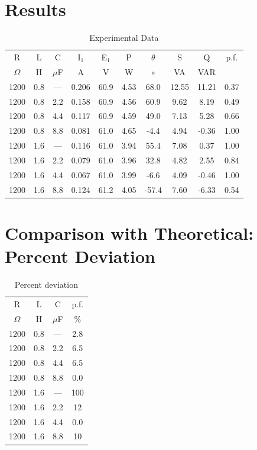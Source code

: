 \documentclass{article}
\begin{document}
\section{Results}
\begin{table}[h]
  \begin{center}
    \begin{tabular}{cccccccccc}
      \hline
      R & L & C & I$_1$ & E$_1$ & P & $\theta$ & S & Q & p.f. \\
      $\Omega$ & H & $\mu$F & A & V & W & $\circ$ & VA & VAR & \\
      \hline
      1200 & 0.8 & --- & 0.206 & 60.9 & 4.53 &  68.0 & 12.55 & 11.21 & 0.37 \\
      1200 & 0.8 & 2.2 & 0.158 & 60.9 & 4.56 &  60.9 &  9.62 &  8.19 & 0.49 \\
      1200 & 0.8 & 4.4 & 0.117 & 60.9 & 4.59 &  49.0 &  7.13 &  5.28 & 0.66 \\
      1200 & 0.8 & 8.8 & 0.081 & 61.0 & 4.65 &  -4.4 &  4.94 & -0.36 & 1.00 \\
      1200 & 1.6 & --- & 0.116 & 61.0 & 3.94 &  55.4 &  7.08 &  0.37 & 1.00 \\
      1200 & 1.6 & 2.2 & 0.079 & 61.0 & 3.96 &  32.8 &  4.82 &  2.55 & 0.84 \\
      1200 & 1.6 & 4.4 & 0.067 & 61.0 & 3.99 &  -6.6 &  4.09 & -0.46 & 1.00 \\
      1200 & 1.6 & 8.8 & 0.124 & 61.2 & 4.05 & -57.4 &  7.60 & -6.33 & 0.54 \\
      \hline
    \end{tabular}
    \caption{Experimental Data}
    \label{meas_data}
  \end{center}
\end{table}

\section{Comparison with Theoretical: Percent Deviation}
\begin{table}[h]
  \begin{center}
    \begin{tabular}{|ccc||c|}
      \hline
      R & L & C & p.f. \\
      $\Omega$ & H & $\mu$F & \% \\
      \hline
      1200 & 0.8 & --- & 2.8 \\
      1200 & 0.8 & 2.2 & 6.5 \\
      1200 & 0.8 & 4.4 & 6.5 \\
      1200 & 0.8 & 8.8 & 0.0 \\
      1200 & 1.6 & --- & 100 \\
      1200 & 1.6 & 2.2 & 12  \\
      1200 & 1.6 & 4.4 & 0.0 \\
      1200 & 1.6 & 8.8 & 10  \\
      \hline
    \end{tabular}
    \caption{Percent deviation}
    \label{percent_dev}
  \end{center}
\end{table}
\end{document}

